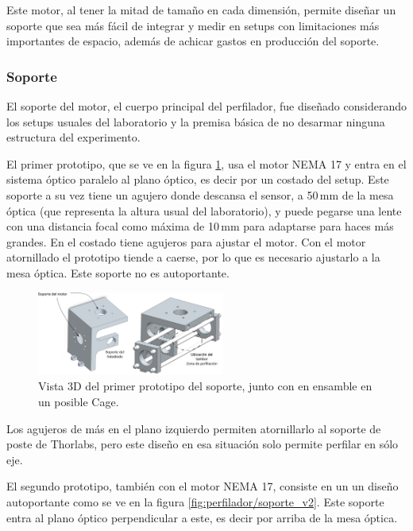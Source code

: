 Este motor, al tener la mitad de tamaño en cada dimensión, permite diseñar un soporte que sea más fácil de integrar y medir en setups con limitaciones más importantes de espacio, además de achicar gastos en producción del soporte.

\subsubsection{Soporte}

El soporte del motor, el cuerpo principal del perfilador, fue diseñado considerando los setups usuales del laboratorio y la premisa básica de no desarmar ninguna estructura del experimento. 

El primer prototipo, que se ve en la figura \ref{fig:perfilador/soporte_v1}, usa el motor NEMA 17 y entra en el sistema óptico paralelo al plano óptico, es decir por un costado del setup. Este soporte a su vez tiene un agujero donde descansa el sensor, a 50$\,$mm de la mesa óptica (que representa la altura usual del laboratorio), y puede pegarse una lente con una distancia focal como máxima de 10$\,$mm para adaptarse para haces más grandes. En el costado tiene agujeros para ajustar el motor. Con el motor atornillado el prototipo tiende a caerse, por lo que es necesario ajustarlo a la mesa óptica. Este soporte no es autoportante.

\begin{figure}[H]
\centering
\includegraphics[width=0.55\textwidth]{fig/perfilador/soporte_v1}
\caption{Vista 3D del primer prototipo del soporte, junto con en ensamble en un posible Cage.}
\label{fig:perfilador/soporte_v1}
\end{figure}

Los agujeros de más en el plano izquierdo permiten atornillarlo al soporte de poste de Thorlabs, pero este diseño en esa situación solo permite perfilar en sólo eje.

El segundo prototipo, también con el motor NEMA 17, consiste en un un diseño autoportante como se ve en la figura \ref{fig:perfilador/soporte_v2}. Este soporte entra al plano óptico perpendicular a este, es decir por arriba de la mesa óptica.

